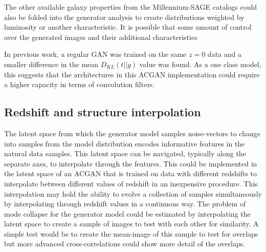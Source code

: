 \documentclass[twocolumn]{article}
\numberwithin{equation}{section}
\begin{document}
The other available galaxy properties from the Millennium-SAGE catalogs could also be folded into the generator analysis
to create distributions weighted by luminosity or another characteristic. It is possible that some amount of control over
the generated images and their additional characteristics

In previous work, a regular GAN was trained on the same $z=0$ data and a smaller difference in the mean $D_{KL}(t||g)$ value
was found. As a one class model, this suggests that the architectures in this ACGAN implementation could require a higher 
capacity in terms of convolution filters.


\subsection{Redshift and structure interpolation} 
The latent space from which the generator model samples noise-vectors to change into samples from the model distribution 
encodes informative features in the natural data samples. This latent space can be navigated, typically along the separate 
axes, to interpolate through the features. This could be implemented in the latent space of an ACGAN that is trained on 
data with different redshifts to interpolate between different values of redshift in an inexpensive procedure. This 
interpolation may hold the ability to evolve a collection of samples simultaneously by interpolating through redshift 
values in a continuous way. The problem of mode collapse for the generator model could be estimated by interpolating the 
latent space to create a sample of images to test with each other for similarity. A simple test would be to create the 
mean-image of this sample to test for overlaps but more advanced cross-correlations could show more detail of the overlaps.  

\end{document}
